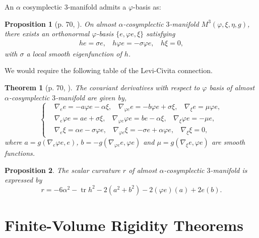 \documentclass[a4paper, twoside, 10pt]{article}
\numberwithin{equation}{section}
\newtheorem{theorem}{Theorem}[section]
\newtheorem{proposition}{Proposition}[section]
\theoremstyle{definition}
\begin{document}
\bigskip 


An $\alpha$ cosymplectic $3$-manifold
admits a $\varphi$-basis \cite{blair2002riemannian} as:
\begin{proposition}[p. 70, \cite{perrone2018classification}]
On almost $\alpha$-cosymplectic $3$-manifold
  $M^{3}(\varphi,\xi,\eta,g)$,  there exists an orthonormal $\varphi$-basis $\{e,\varphi e, \xi \}$ satisfying
  \begin{eqnarray*}
  he=\sigma e,~~~~
  h \varphi e=-\sigma \varphi e,~~~~
  h\xi=0,
  \end{eqnarray*}
  with $\sigma$ a local smooth eigenfunction of $h$.
\end{proposition}

We would require the following table of the Levi-Civita connection.

\begin{theorem}[p. 70, \cite{perrone2018classification}]\label{lc} 
The covariant derivatives with respect to $\varphi$ basis of almost $\alpha$-cosymplectic $3$-manifold are given by,
  \begin{equation}\label{eq5}
    \begin{cases}
       & \nabla_ee=-a \varphi e-\alpha\xi,~~~~ \nabla_{\varphi e} e=-b \varphi e+\sigma\xi,~~~~ \nabla_\xi e=\mu \varphi e,  \\
       & \nabla_e \varphi e=ae+\sigma\xi,~~~~ \nabla_{\varphi e}\varphi  e=be-\alpha\xi,~~~~ \nabla_\xi \varphi e=-\mu e,  \\
       & \nabla_e\xi =\alpha e-\sigma \varphi e,~~~~ \nabla_{\varphi e}\xi=-\sigma e+\alpha \varphi e,~~~~ \nabla_\xi\xi=0,
    \end{cases}
  \end{equation}
   where $a=g(\nabla_e \varphi e, e)$, $b=-g(\nabla_{\varphi e}e, \varphi e)$ and $\mu=g(\nabla_\xi e, \varphi e)$ are smooth functions.
\end{theorem}

\begin{proposition}\cite{perrone2018classification} \label{r}
The scalar curvature $r$ of almost $\alpha$-cosymplectic $3$-manifold is expressed by
\begin{equation}
r=-6 \alpha^{2}-\operatorname{tr} h^{2}-2\left(a^{2}+b^{2}\right)-2(\varphi e)(a)+2 e(b). 
\end{equation}
\end{proposition}


\section{Finite-Volume Rigidity Theorems}
\end{document}
